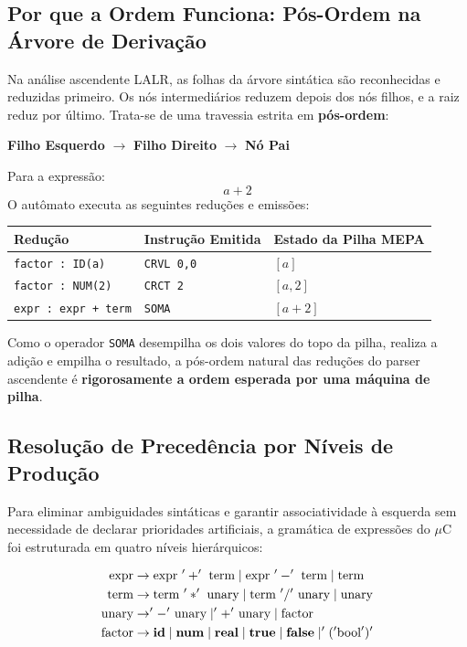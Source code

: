 \documentclass[12pt,a4paper]{article}
\begin{document}
\subsection{Por que a Ordem Funciona: Pós-Ordem na Árvore de Derivação}

Na análise ascendente LALR, as folhas da árvore sintática são reconhecidas e reduzidas
primeiro. Os nós intermediários reduzem depois dos nós filhos, e a raiz reduz por
último. Trata-se de uma travessia estrita em \textbf{pós-ordem}:
\begin{center}
\textbf{Filho Esquerdo} $\rightarrow$ \textbf{Filho Direito} $\rightarrow$ \textbf{Nó Pai}
\end{center}

Para a expressão:
\[
a + 2
\]
O autômato executa as seguintes reduções e emissões:
\begin{center}
\begin{tabular}{lll}
\toprule
\textbf{Redução} & \textbf{Instrução Emitida} & \textbf{Estado da Pilha MEPA} \\
\midrule
\texttt{factor : ID(a)}     & \texttt{CRVL 0,0} & $[a]$ \\
\texttt{factor : NUM(2)}    & \texttt{CRCT 2}   & $[a, 2]$ \\
\texttt{expr : expr + term} & \texttt{SOMA}     & $[a + 2]$ \\
\bottomrule
\end{tabular}
\end{center}

Como o operador \texttt{SOMA} desempilha os dois valores do topo da pilha, realiza a adição
e empilha o resultado, a pós-ordem natural das reduções do parser ascendente é
\textbf{rigorosamente a ordem esperada por uma máquina de pilha}.

\subsection{Resolução de Precedência por Níveis de Produção}

Para eliminar ambiguidades sintáticas e garantir associatividade à esquerda sem
necessidade de declarar prioridades artificiais, a gramática de expressões do $\mu$C
foi estruturada em quatro níveis hierárquicos:

\begin{align*}
    \text{expr}  &\rightarrow \text{expr } '+' \text{ term} \mid \text{expr } '-' \text{ term} \mid \text{term} \\
    \text{term}  &\rightarrow \text{term } '*' \text{ unary} \mid \text{term } '/' \text{ unary} \mid \text{unary} \\
    \text{unary} &\rightarrow '-' \text{ unary} \mid '+' \text{ unary} \mid \text{factor} \\
    \text{factor}&\rightarrow \text{\textbf{id}} \mid \text{\textbf{num}} \mid \text{\textbf{real}} \mid \text{\textbf{true}} \mid \text{\textbf{false}} \mid '(' \text{bool} ')'
\end{align*}
\end{document}
